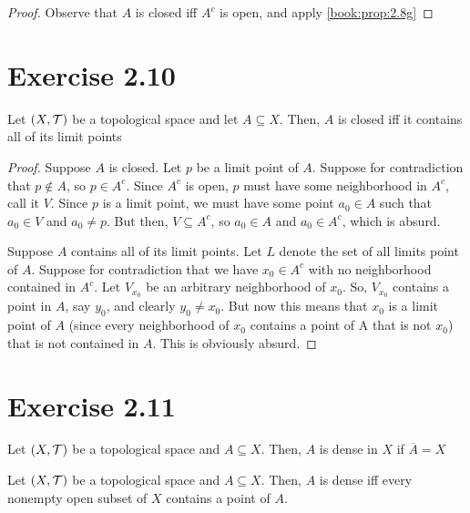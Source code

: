 \documentclass{article}
\begin{document}
\begin{proof}
    Observe that $A$ is closed iff $A^c$ is open, and apply \cref{book:prop:2.8g}
\end{proof}

\section{Exercise 2.10}

\begin{proposition}
\label{book:ex:2.10}
    Let $(X, \mathcal{T})$ be a topological space and let $A \subseteq X$. Then, $A$ is closed
    iff it contains all of its limit points
\end{proposition}
\begin{proof}
    \forwarddir Suppose $A$ is closed. Let $p$ be a limit point of $A$.
    Suppose for contradiction that $p \notin A$, so $p \in A^c$.
    Since $A^c$ is open, $p$ must have some neighborhood in $A^c$,
    call it $V$. Since $p$ is a limit point, we must have some point $a_0 \in A$ such
    that $a_0 \in V$ and $a_0 \neq p$. 
    But then, $V \subseteq A^c$, so $a_0 \in A$ and $a_0 \in A^c$, which is absurd.

    \conversedir Suppose $A$ contains all of its limit points. Let $L$ denote the 
    set of all limits point of $A$.
    Suppose for contradiction that we have $x_0 \in A^c$ with no neighborhood contained in $A^c$.
    Let $V_{x_0}$ be an arbitrary neighborhood of $x_0$.
    So, $V_{x_0}$ contains a point in $A$, say $y_0$, and clearly $y_0 \neq x_0$.
    But now this means that $x_0$ is a limit point of $A$ (since every neighborhood of $x_0$ contains a point of A that is not $x_0$) that is not contained in $A$.
    This is obviously absurd. 
    
\end{proof}

\section{Exercise 2.11}

\begin{definition}
    Let $(X, \mathcal{T})$ be a topological space and $A \subseteq X$. Then, $A$ is dense in $X$
    if $\overline{A} = X$
\end{definition}

\begin{proposition}
    \label{book:ex:2.11}
    Let $(X, \mathcal{T})$ be a topological space and $A \subseteq X$. Then, $A$ is dense
    iff every nonempty open subset of $X$ contains a point of $A$.
\end{proposition}
\end{document}
